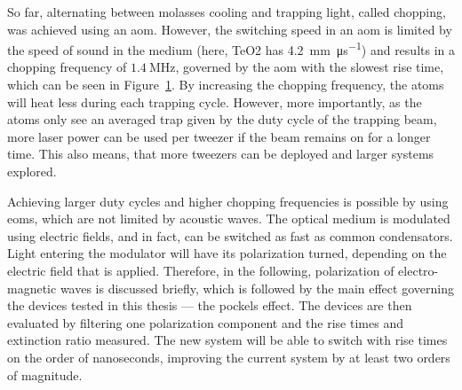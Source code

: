 So far, alternating between molasses cooling and trapping light, called chopping, was achieved using an \ac{aom}. However, the switching speed in an \ac{aom} is limited by the speed of sound in the medium (here, TeO2 has \SI{4.2}{\milli\meter\per\micro\second}) and results in a chopping frequency of $\SI{1.4}{\mega\hertz}$, governed by the \ac{aom} with the slowest rise time, which can be seen in Figure~\ref{fig:aom_chopping}. By increasing the chopping frequency, the atoms will heat less during each trapping cycle. However, more importantly, as the atoms only see an averaged trap given by the duty cycle of the trapping beam, more laser power can be used per tweezer if the beam remains on for a longer time. This also means, that more tweezers can be deployed and larger systems explored.

\begin{figure}[t]%
\label{fig:aom_chopping}
\end{figure}

Achieving larger duty cycles and higher chopping frequencies is possible by using \acp{eom}, which are not limited by acoustic waves. The optical medium is modulated using electric fields, and in fact, can be switched as fast as common condensators. Light entering the modulator will have its polarization turned, depending on the electric field that is applied. Therefore, in the following, polarization of electro-magnetic waves is discussed briefly, which is followed by the main effect governing the devices tested in this thesis --- the pockels effect. The devices are then evaluated by filtering one polarization component and the rise times and extinction ratio measured. The new system will be able to switch with rise times on the order of nanoseconds, improving the current system by at least two orders of magnitude.

